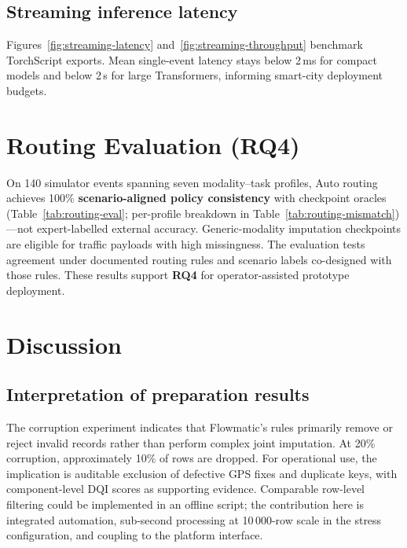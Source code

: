 \subsection{Streaming inference latency}

Figures~\ref{fig:streaming-latency} and~\ref{fig:streaming-throughput} benchmark TorchScript exports. Mean single-event latency stays below 2\,ms for compact models and below 2\,s for large Transformers, informing smart-city deployment budgets.

\section{Routing Evaluation (RQ4)}
\label{sec:routing_results}

On 140 simulator events spanning seven modality--task profiles, Auto routing achieves 100\% \textbf{scenario-aligned policy consistency} with checkpoint oracles (Table~\ref{tab:routing-eval}; per-profile breakdown in Table~\ref{tab:routing-mismatch})---not expert-labelled external accuracy. Generic-modality imputation checkpoints are eligible for traffic payloads with high missingness. The evaluation tests agreement under documented routing rules and scenario labels co-designed with those rules. These results support \textbf{RQ4} for operator-assisted prototype deployment.



\section{Discussion}
\label{sec:discussion}

\subsection{Interpretation of preparation results}

The corruption experiment indicates that Flowmatic's rules primarily remove or reject invalid records rather than perform complex joint imputation. At 20\% corruption, approximately 10\% of rows are dropped. For operational use, the implication is auditable exclusion of defective GPS fixes and duplicate keys, with component-level DQI scores as supporting evidence. Comparable row-level filtering could be implemented in an offline script; the contribution here is integrated automation, sub-second processing at 10\,000-row scale in the stress configuration, and coupling to the platform interface.

